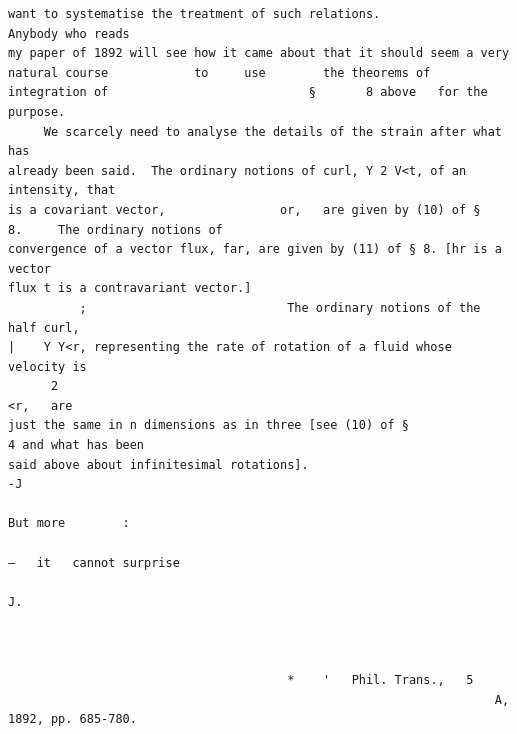 \documentclass[10pt]{article}
\begin{document}
\begin{verbatim}
want to systematise the treatment of such relations.                                                 Anybody who reads
my paper of 1892 will see how it came about that it should seem a very
natural course            to     use        the theorems of integration of                            §       8 above   for the
purpose.
     We scarcely need to analyse the details of the strain after what has
already been said.  The ordinary notions of curl, Y 2 V<t, of an intensity, that
is a covariant vector,                or,   are given by (10) of §                      8.     The ordinary notions of
convergence of a vector flux, far, are given by (11) of § 8. [hr is a vector
flux t is a contravariant vector.]
          ;                            The ordinary notions of the half curl,
|    Y Y<r, representing the rate of rotation of a fluid whose velocity is
      2                                                                                                                  <r,   are
just the same in n dimensions as in three [see (10) of §                                             4 and what has been
said above about infinitesimal rotations].                              -J
                                                                                 But more        :
                                                                                                     —   it   cannot surprise
                                                                                                                          J.



                                       *    '   Phil. Trans.,   5
                                                                    A, 1892, pp. 685-780.


\end{verbatim}
\clearpage
\end{document}
